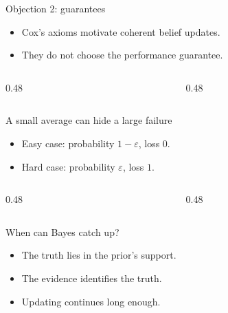 \documentclass[11pt,aspectratio=169]{beamer}
\begin{document}
\begin{frame}{Objection 2: guarantees}
\large
\begin{itemize}
    \item<1-> Cox's axioms motivate coherent belief updates.
    \item<2-> They do not choose the performance guarantee.
\end{itemize}
\begin{columns}[T,onlytextwidth]
\begin{column}{0.48\textwidth}
\end{column}
\begin{column}{0.48\textwidth}
\end{column}
\end{columns}
\end{frame}

\begin{frame}{A small average can hide a large failure}
\Large
\begin{itemize}
    \item<1-> Easy case: probability $1-\varepsilon$, loss $0$.
    \item<2-> Hard case: probability $\varepsilon$, loss $1$.
\end{itemize}
\begin{columns}[T,onlytextwidth]
\begin{column}{0.48\textwidth}
\end{column}
\begin{column}{0.48\textwidth}
\end{column}
\end{columns}
\end{frame}

\begin{frame}{When can Bayes catch up?}
\Large
\begin{itemize}
    \item<1-> The truth lies in the prior's support.
    \item<2-> The evidence identifies the truth.
    \item<3-> Updating continues long enough.
\end{itemize}
\end{frame}
\end{document}

